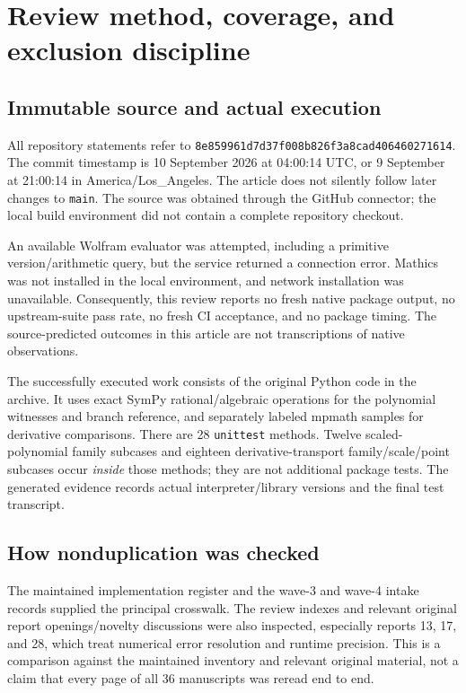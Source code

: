 \documentclass[11pt,letterpaper]{article}
\newcommand{\code}[1]{{\small\nolinkurl{#1}}}
\newcommand{\SHA}{8e859961d7d37f008b826f3a8cad406460271614}
\begin{document}
\section{Review method, coverage, and exclusion discipline}
\label{sec:method}

\subsection{Immutable source and actual execution}

All repository statements refer to \texttt{\SHA}. The commit timestamp is 10 September 2026 at 04:00:14 UTC, or 9 September at 21:00:14 in America/Los\_Angeles. The article does not silently follow later changes to \code{main}. The source was obtained through the GitHub connector; the local build environment did not contain a complete repository checkout.\cite{snapshot}

An available Wolfram evaluator was attempted, including a primitive version/arithmetic query, but the service returned a connection error. Mathics was not installed in the local environment, and network installation was unavailable. Consequently, this review reports no fresh native package output, no upstream-suite pass rate, no fresh CI acceptance, and no package timing. The source-predicted outcomes in this article are not transcriptions of native observations.

The successfully executed work consists of the original Python code in the archive. It uses exact SymPy rational/algebraic operations for the polynomial witnesses and branch reference, and separately labeled mpmath samples for derivative comparisons. There are 28 \code{unittest} methods. Twelve scaled-polynomial family subcases and eighteen derivative-transport family/scale/point subcases occur \emph{inside} those methods; they are not additional package tests. The generated evidence records actual interpreter/library versions and the final test transcript.

\subsection{How nonduplication was checked}

The maintained implementation register and the wave-3 and wave-4 intake records supplied the principal crosswalk. The review indexes and relevant original report openings/novelty discussions were also inspected, especially reports 13, 17, and 28, which treat numerical error resolution and runtime precision. This is a comparison against the maintained inventory and relevant original material, not a claim that every page of all 36 manuscripts was reread end to end.\cite{status,wave3,wave4,review13,review17,review28}
\end{document}
